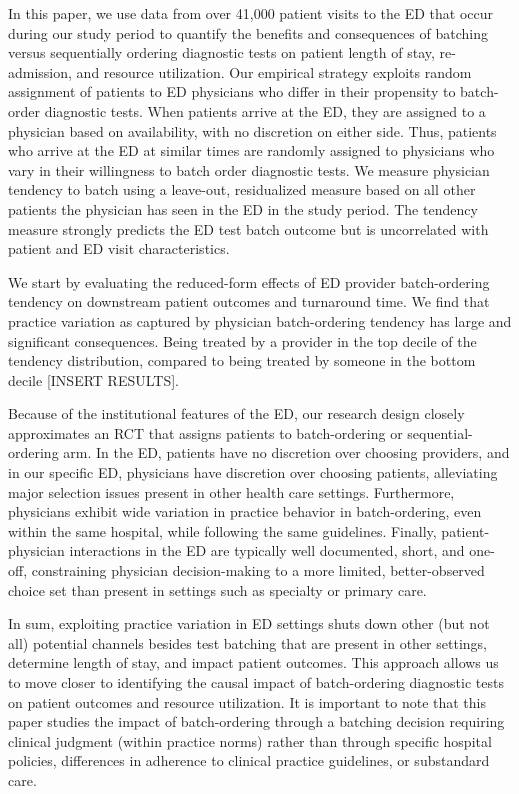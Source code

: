\documentclass[,,nonblindrev]{informs}
\begin{document}
In this paper, we use data from over 41,000 patient visits to the ED
that occur during our study period to quantify the benefits and
consequences of batching versus sequentially ordering diagnostic tests
on patient length of stay, re-admission, and resource utilization. Our
empirical strategy exploits random assignment of patients to ED
physicians who differ in their propensity to batch-order diagnostic
tests. When patients arrive at the ED, they are assigned to a physician
based on availability, with no discretion on either side. Thus, patients
who arrive at the ED at similar times are randomly assigned to
physicians who vary in their willingness to batch order diagnostic
tests. We measure physician tendency to batch using a leave-out,
residualized measure based on all other patients the physician has seen
in the ED in the study period. The tendency measure strongly predicts
the ED test batch outcome but is uncorrelated with patient and ED visit
characteristics.

We start by evaluating the reduced-form effects of ED provider
batch-ordering tendency on downstream patient outcomes and turnaround
time. We find that practice variation as captured by physician
batch-ordering tendency has large and significant consequences. Being
treated by a provider in the top decile of the tendency distribution,
compared to being treated by someone in the bottom decile {[}INSERT
RESULTS{]}.

Because of the institutional features of the ED, our research design
closely approximates an RCT that assigns patients to batch-ordering or
sequential-ordering arm. In the ED, patients have no discretion over
choosing providers, and in our specific ED, physicians have discretion
over choosing patients, alleviating major selection issues present in
other health care settings. Furthermore, physicians exhibit wide
variation in practice behavior in batch-ordering, even within the same
hospital, while following the same guidelines. Finally,
patient-physician interactions in the ED are typically well documented,
short, and one-off, constraining physician decision-making to a more
limited, better-observed choice set than present in settings such as
specialty or primary care.

In sum, exploiting practice variation in ED settings shuts down other
(but not all) potential channels besides test batching that are present
in other settings, determine length of stay, and impact patient
outcomes. This approach allows us to move closer to identifying the
causal impact of batch-ordering diagnostic tests on patient outcomes and
resource utilization. It is important to note that this paper studies
the impact of batch-ordering through a batching decision requiring
clinical judgment (within practice norms) rather than through specific
hospital policies, differences in adherence to clinical practice
guidelines, or substandard care.
\end{document}
